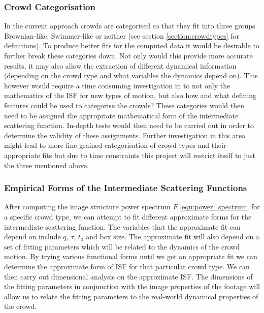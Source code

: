 \documentclass[10pt]{article}
\begin{document}
\subsubsection{Crowd Categorisation}
In the current approach crowds are categorised so that they fit into three groups Brownian-like, Swimmer-like or neither (see section \ref{section:crowdtypes} for definitions). To produce better fits for the computed data it would be desirable to further break these categories down. Not only would this provide more accurate results, it may also allow the extraction of different dynamical information (depending on the crowd type and what variables the dynamics depend on). This however would require a time consuming investigation in to not only the mathematics of the ISF for new types of motion, but also how and what defining features could be used to categorise the crowds? These categories would then need to be assigned the appropriate mathematical form of the intermediate scattering function. In-depth tests would then need to be carried out in order to determine the validity of these assignments. Further investigation in this area might lead to more fine grained categorisation of crowd types and their appropriate fits but due to time constraints this project will restrict itself to just the three mentioned above.

\subsubsection{Empirical Forms of the Intermediate Scattering Functions}
After computing the image structure power spectrum $F$ \ref{eqn:power_spectrum} for a specific crowd type, we can attempt to fit different approximate forms for the intermediate scattering function. The variables that the approximate fit can depend on include $q$, $\tau$, $t_0$ and box size. The approximate fit will also depend on a set of fitting parameters which will be related to the dynamics of the crowd motion. By trying various functional forms until we get an appropriate fit we can determine the approximate form of ISF for that particular crowd type. We can then carry out dimensional analysis on the approximate ISF. The dimensions of the fitting parameters in conjunction with the image properties of the footage will allow us to relate the fitting parameters to the real-world dynamical properties of the crowd.
\end{document}
